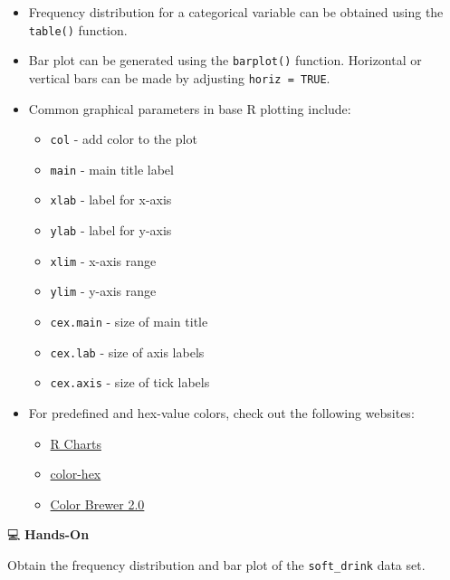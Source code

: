 \documentclass[
  letterpaper,
  DIV=11,
  numbers=noendperiod]{scrreprt}
\providecommand{\tightlist}{%
  \setlength{\itemsep}{0pt}\setlength{\parskip}{0pt}}\usepackage{longtable,booktabs,array}
\begin{document}
\begin{itemize}
\item
  Frequency distribution for a categorical variable can be obtained
  using the \texttt{table()} function.
\item
  Bar plot can be generated using the \texttt{barplot()} function.
  Horizontal or vertical bars can be made by adjusting
  \texttt{horiz\ =\ TRUE}.
\item
  Common graphical parameters in base R plotting include:

  \begin{itemize}
  \tightlist
  \item
    \texttt{col} - add color to the plot
  \item
    \texttt{main} - main title label
  \item
    \texttt{xlab} - label for x-axis
  \item
    \texttt{ylab} - label for y-axis
  \item
    \texttt{xlim} - x-axis range
  \item
    \texttt{ylim} - y-axis range
  \item
    \texttt{cex.main} - size of main title
  \item
    \texttt{cex.lab} - size of axis labels
  \item
    \texttt{cex.axis} - size of tick labels
  \end{itemize}
\item
  For predefined and hex-value colors, check out the following websites:

  \begin{itemize}
  \tightlist
  \item
    \href{https://r-charts.com/colors/}{R Charts}
  \item
    \href{https://www.color-hex.com/}{color-hex}
  \item
    \href{https://colorbrewer2.org/\#type=sequential&scheme=BuGn&n=3}{Color
    Brewer 2.0}
  \end{itemize}
\end{itemize}

💻 \textbf{Hands-On}

Obtain the frequency distribution and bar plot of the
\texttt{soft\_drink} data set.
\end{document}
